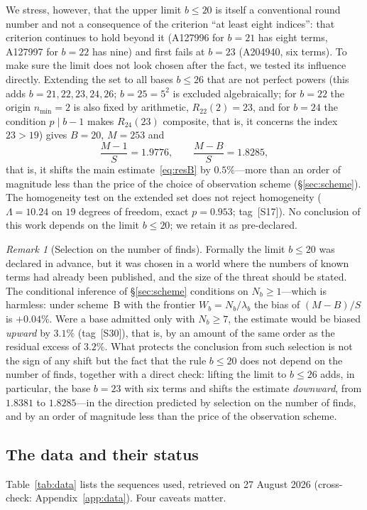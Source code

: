 \documentclass[11pt,a4paper]{article}
\theoremstyle{plain}
\theoremstyle{remark}
\newtheorem{remark}{Remark}
\begin{document}
We stress, however, that the upper limit $b\le20$ is itself a conventional round
number and not a consequence of the criterion ``at least eight indices'': that
criterion continues to hold beyond it (A127996 for $b=21$ has eight terms,
A127997 for $b=22$ has nine) and first fails at $b=23$ (A204940, six terms). To
make sure the limit does not look chosen after the fact, we tested its influence
directly. Extending the set to all bases $b\le26$ that are not perfect powers
(this adds $b=21,22,23,24,26$; $b=25=5^2$ is excluded algebraically; for $b=22$
the origin $n_{\min}=2$ is also fixed by arithmetic, $R_{22}(2)=23$, and for
$b=24$ the condition $p\mid b-1$ makes $R_{24}(23)$ composite, that is, it
concerns the index $23>19$) gives $B=20$, $M=253$ and
\[
  \frac{M-1}{S}=1.9776,\qquad \frac{M-B}{S}=1.8285,
\]
that is, it shifts the main estimate~\eqref{eq:resB} by $0.5\%$---more than an
order of magnitude less than the price of the choice of observation scheme
(\S\ref{sec:scheme}). The homogeneity test on the extended set does not reject
homogeneity ($\Lambda=10.24$ on $19$ degrees of freedom, exact $p=0.953$;
tag~[S17]). No conclusion of this work depends on the limit $b\le20$; we retain
it as pre-declared.

\begin{remark}[Selection on the number of finds]\label{rem:selection}
Formally the limit $b\le20$ was declared in advance, but it was chosen in a
world where the numbers of known terms had already been published, and the size
of the threat should be stated. The conditional inference of \S\ref{sec:scheme}
conditions on $N_b\ge1$---which is harmless: under scheme~B with the frontier
$W_b=N_b/\lambda_b$ the bias of $(M-B)/S$ is $+0.04\%$. Were a base admitted only
with $N_b\ge7$, the estimate would be biased \emph{upward} by $3.1\%$ (tag~[S30]),
that is, by an amount of the same order as the residual excess of $3.2\%$. What
protects the conclusion from such selection is not the sign of any shift but the
fact that the rule $b\le20$ does not depend on the number of finds, together with
a direct check: lifting the limit to $b\le26$ adds, in particular, the base
$b=23$ with six terms and shifts the estimate \emph{downward}, from $1.8381$ to
$1.8285$---in the direction predicted by selection on the number of finds, and by
an order of magnitude less than the price of the observation scheme.
\end{remark}

\subsection{The data and their status}
Table~\ref{tab:data} lists the sequences used, retrieved on 27 August 2026
(cross-check: Appendix~\ref{app:data}). Four caveats matter.
\end{document}
